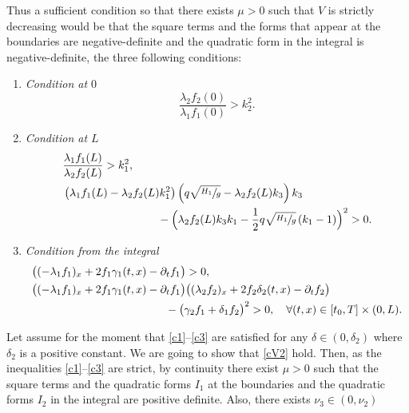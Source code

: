 \documentclass[JEP,XML,SOM,Unicode]{cedram}
\theoremstyle{definition}
\begin{document}
Thus a sufficient condition {so that there exists $\mu>0$ such} that $V$ is strictly decreasing would be that the square terms and the forms that appear at the boundaries are negative-definite and the quadratic form in the integral is negative-definite, \ie the three following conditions:
\begin{enumerate}
\item \emph{Condition at $0$}
\begin{equation}
\label{c1}
\frac{\lambda_{2}f_{2}(0)}{\lambda_{1}f_{1}(0)}>k_{2}^{2}.
\end{equation}
\item \emph{Condition at $L$}
\begin{subequations}
\label{c2}
\begin{align}
\label{c2a}
&\frac{\lambda_{1}f_{1}(L)}{\lambda_{2}f_{2}(L)}>k_{1}^{2},\\
\label{c2b}
&\left(\lambda_{1}f_{1}(L)-\lambda_{2}f_{2}(L)k_{1}^{2}\right)\left(q\sqrt{\sfrac{H_{1}}{g}}-\lambda_{2}f_{2}(L)k_{3}\right)k_{3}\\
&\hspace*{3cm}-\Bigl(\lambda_{2}f_{2}(L)k_{3}k_{1}-\frac{1}{2}q\sqrt{\sfrac{H_{1}}{g}}\left(k_{1}-1\right)\Bigr)^{2}>0. \notag
\end{align}
\end{subequations}
\item \emph{Condition from the integral}
\begin{equation}\label{c3}
\begin{aligned}
&\bigl((-\lambda_{1}f_{1})_{x}+2f_{1}\gamma_{1}(t,x)-\partial_{t}f_{1}\bigr)>0,
\\
&\bigl((-\lambda_{1}f_{1})_{x}+2f_{1}\gamma_{1}(t,x)-\partial_{t}f_{1}\bigr)\bigl((\lambda_{2}f_{2})_{x}+2f_{2}\delta_{2}(t,x)-\partial_{t}f_{2}\bigr)
\\
& \hspace*{4.2cm}-\bigl(\gamma_{2}f_{1}+\delta_{1}f_{2}\bigr)^{2}>0,\quad\forall (t,x)\in [t_{0},T]\times(0,L).
\end{aligned}
\end{equation}
\end{enumerate}
Let assume for the moment that \eqref{c1}--\eqref{c3} are satisfied
for any $\delta\in(0,\delta_{{2}})$ where $\delta_{{2}}$ is a positive constant. {We are going to show that \eqref{cV2} hold.}
Then, as the inequalities \eqref{c1}--\eqref{c3} are strict, by continuity there exist $\mu>0$ such that the square terms and the quadratic forms {$I_{1}$} at the boundaries and the quadratic forms {$I_{2}$} in the integral are positive definite. {Also,} there exists $\nu_{3}\in(0,\nu_{2})$
\end{document}
